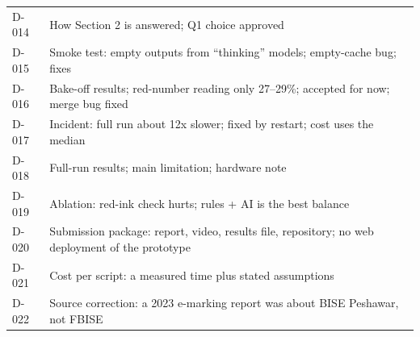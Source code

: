 \begin{small}
\begin{tabularx}{\linewidth}{@{}P{1.2cm}L@{}}
D-014 & How Section 2 is answered; Q1 choice approved  \\
D-015 & Smoke test: empty outputs from ``thinking'' models; empty-cache bug; fixes  \\
D-016 & Bake-off results; red-number reading only 27--29\%; accepted for now; merge bug fixed  \\
D-017 & Incident: full run about 12x slower; fixed by restart; cost uses the median  \\
D-018 & Full-run results; main limitation; hardware note  \\
D-019 & Ablation: red-ink check hurts; rules + AI is the best balance  \\
D-020 & Submission package: report, video, results file, repository; no web deployment of the prototype  \\
D-021 & Cost per script: a measured time plus stated assumptions  \\
D-022 & Source correction: a 2023 e-marking report was about BISE Peshawar, not FBISE  \\
\bottomrule
\end{tabularx}
\end{small}
